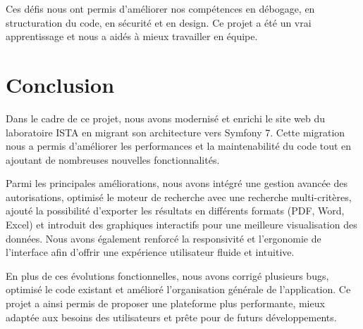 \documentclass[12pt]{article}
\begin{document}
    Ces défis nous ont permis d’améliorer nos compétences en débogage, en structuration du code, en sécurité et en design. Ce projet a été un vrai apprentissage et nous a aidés à mieux travailler en équipe.

    \newpage


    \section{Conclusion}
    Dans le cadre de ce projet, nous avons modernisé et enrichi le site web du laboratoire ISTA en migrant son architecture vers Symfony 7. Cette migration nous a permis d’améliorer les performances et la maintenabilité du code tout en ajoutant de nombreuses nouvelles fonctionnalités.

    Parmi les principales améliorations, nous avons intégré une gestion avancée des autorisations, optimisé le moteur de recherche avec une recherche multi-critères, ajouté la possibilité d’exporter les résultats en différents formats (PDF, Word, Excel) et introduit des graphiques interactifs pour une meilleure visualisation des données. Nous avons également renforcé la responsivité et l’ergonomie de l’interface afin d’offrir une expérience utilisateur fluide et intuitive.

En plus de ces évolutions fonctionnelles, nous avons corrigé plusieurs bugs, optimisé le code existant et amélioré l'organisation générale de l'application. Ce projet a ainsi permis de proposer une plateforme plus performante, mieux adaptée aux besoins des utilisateurs et prête pour de futurs développements.
\end{document}
